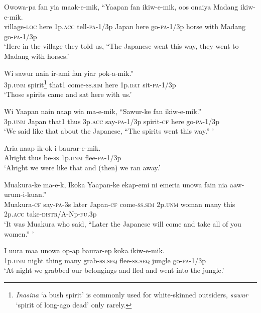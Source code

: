{\ea\label{ex:a:x11}
\gll  Owowa-pa  fan  yia  maak-e-mik,  “Yaapan  fan  ikiw-e-mik,       oos  onaiya  Madang  ikiw-e-mik. \\
village-\textsc{loc}  here  1p.\textsc{acc}  tell-\textsc{pa}-1/3p  Japan  here  go-\textsc{pa}-1/3p horse  with  Madang  go-\textsc{pa}-1/3p \\
\glt ‘Here in the village they told us, “The Japanese went this way, they went to Madang with horses.’ \\
\z


\ea\label{ex:a:x12}
\gll  Wi  sawur  nain  ir-ami  fan  yiar  pok-a-mik.” \\
3p.\textsc{unm}  spirit\footnote{ \textit{Inasina} ‘a bush spirit’ is commonly used for white-skinned outsiders, \textit{sawur} ‘spirit of long-ago dead’ only rarely.}  that1  come-\textsc{ss}.\textsc{sim}  here  1p.\textsc{dat}  sit-\textsc{pa}-1/3p \\
\glt ‘Those spirits came and sat here with us.’ \\
\z


\ea\label{ex:a:x13}
\gll  Wi  Yaapan  nain  naap  wia  ma-e-mik,  “Sawur-ke       fan  ikiw-e-mik.” \\
3p.\textsc{unm}  Japan  that1  thus  3p.\textsc{acc}  say-\textsc{pa}-1/3p  spirit-\textsc{cf} here  go-\textsc{pa}-1/3p \\
\glt ‘We said like that about the Japanese, “The spirits went this way.” ’ \\
\z


\ea\label{ex:a:x14}
\gll  Aria  naap  ik-ok  i  baurar-e-mik. \\
Alright  thus  be-\textsc{ss}  1p.\textsc{unm}  flee-\textsc{pa}-1/3p \\
\glt ‘Alright we were like that and (then) we ran away.’ \\
\z


\ea\label{ex:a:x15}
\gll  Muakura-ke  ma-e-k,  {\textquotedbl}Ikoka  Yaapan-ke  ekap-emi  ni       emeria  unowa  fain  nia  aaw-urum-i-kuan.” \\
Muakura-\textsc{cf}  say-\textsc{pa}-3s  later  Japan-\textsc{cf}  come-\textsc{ss}.\textsc{sim}  2p.\textsc{unm} woman  many  this  2p.\textsc{acc}  take-\textsc{distr}/A-Np-\textsc{fu}.3p \\
\glt ‘It was Muakura who said, “Later the Japanese will come and take all of you women.” ’ \\
\z


\ea\label{ex:a:x16}
\gll  I  uura  maa  unowa  op-ap  baurar-ep  koka       ikiw-e-mik. \\
1p.\textsc{unm}  night  thing  many  grab-\textsc{ss.seq}  flee-\textsc{ss.seq}  jungle go-\textsc{pa}-1/3p \\
\glt ‘At night we grabbed our belongings and fled and went into the jungle.’ \\
\z


}
